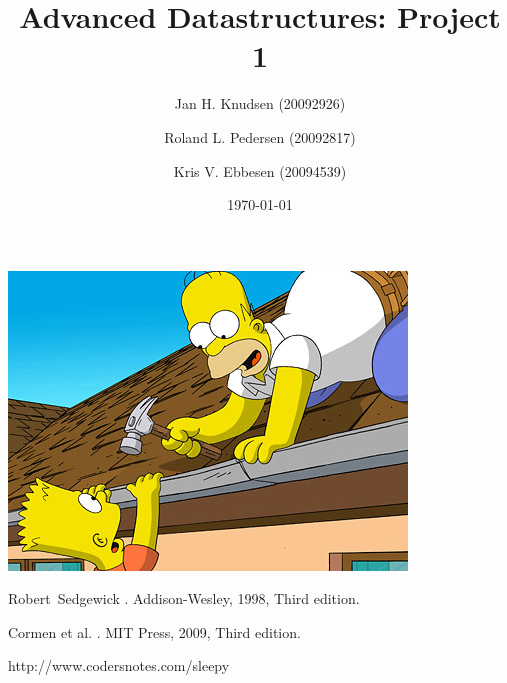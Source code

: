 \documentclass[a4paper, 12pt]{article}
\title{Advanced Datastructures: Project 1}
\date{\today}
\author{Jan H. Knudsen (20092926)
\and
Roland L. Pedersen (20092817)
\and
Kris V. Ebbesen (20094539)
}
\begin{document}
\maketitle
\includegraphics[width=\textwidth]{graphs/homer.jpg}
\newpage
\tableofcontents
\newpage
















\begin{thebibliography}{9}

Robert~Sedgewick
.
\newblock Addison-Wesley, 1998, Third edition.

Cormen et al.
.
\newblock MIT Press, 2009, Third edition.

http://www.codersnotes.com/sleepy



\end{thebibliography}
\end{document}
